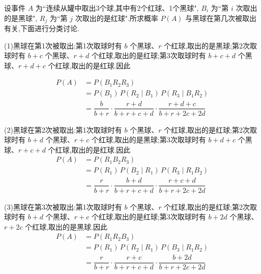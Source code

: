 \begin{solution}
    设事件 $A$ 为``连续从罐中取出3个球,其中有2个红球、1个黑球", $B_i$ 为``第 $i$ 次取出的是黑球", $R_j$ 为``第 $j$ 次取出的是红球".所求概率 $P(A)$ 与黑球在第几次被取出有关,下面进行分类讨论.

    (1)黑球在第1次被取出:第1次取球时有 $b$ 个黑球、$r$ 个红球,取出的是黑球;第2次取球时有 $b+c$ 个黑球、$r+d$ 个红球,取出的是红球;第3次取球时有 $b+c+d$ 个黑球、$r+d+c$ 个红球,取出的是红球.因此

    $$
    \begin{aligned}
        P(A) &= P(B_1 R_2 R_3) \\
        &= P(B_1) \, P(R_2 \mid B_1) \, P(R_3 \mid B_1 R_2) \\
        &= \dfrac{b}{b+r} \cdot \dfrac{r+d}{b+r+c+d} \cdot \dfrac{r+d+c}{b+r+2c+2d}
    \end{aligned}
    $$

    (2)黑球在第2次被取出:第1次取球时有 $b$ 个黑球、$r$ 个红球,取出的是红球;第2次取球时有 $b+d$ 个黑球、$r+c$ 个红球,取出的是黑球;第3次取球时有 $b+d+c$ 个黑球、$r+c+d$ 个红球,取出的是红球.因此
    $$
    \begin{aligned}
        P(A) &= P(R_1 B_2 R_3) \\
        &= P(R_1) \, P(B_2 \mid R_1) \, P(R_3 \mid R_1 B_2) \\
        &= \dfrac{r}{b+r} \cdot \dfrac{b+d}{b+r+c+d} \cdot \dfrac{r+c+d}{b+r+2c+2d}
    \end{aligned}
    $$

    (3)黑球在第3次被取出:第1次取球时有 $b$ 个黑球、$r$ 个红球,取出的是红球;第2次取球时有 $b+d$ 个黑球、$r+c$ 个红球,取出的是红球;第3次取球时有 $b+2d$ 个黑球、$r+2c$ 个红球,取出的是黑球.因此
    $$
    \begin{aligned}
        P(A) &= P(R_1 R_2 B_3) \\
        &= P(R_1) \, P(R_2 \mid R_1) \, P(B_3 \mid R_1 R_2) \\
        &= \dfrac{r}{b+r} \cdot \dfrac{r+c}{b+r+c+d} \cdot \dfrac{b+2d}{b+r+2c+2d}
    \end{aligned}
    $$
\end{solution}

